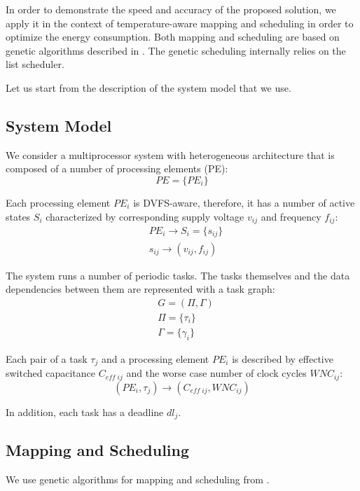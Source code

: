 In order to demonstrate the speed and accuracy of the proposed solution, we apply it in the context of temperature-aware mapping and scheduling in order to optimize the energy consumption. Both mapping and scheduling are based on genetic algorithms described in \cite{schmitz2004}. The genetic scheduling internally relies on the list scheduler.

Let us start from the description of the system model that we use.

\subsection{System Model}
We consider a multiprocessor system with heterogeneous architecture that is composed of a number of processing elements (PE):
\[
  PE = \{ PE_i \}
\]


Each processing element $PE_i$ is DVFS-aware, therefore, it has a number of active states $S_i$ characterized by corresponding supply voltage $v_{ij}$ and frequency $f_{ij}$:
\begin{align*}
  & PE_i \rightarrow S_i = \{ s_{ij} \} \\
  & s_{ij} \rightarrow (v_{ij}, f_{ij})
\end{align*}

The system runs a number of periodic tasks. The tasks themselves and the data dependencies between them are represented with a task graph:
\begin{align*}
  & G = (\Pi, \Gamma) \\
  & \Pi = \{\tau_i\} \\
  & \Gamma = \{\gamma_i\}
\end{align*}

Each pair of a task $\tau_j$ and a processing element $PE_i$ is described by effective switched capacitance $C_{eff \; ij}$ and the worse case number of clock cycles $WNC_{ij}$:
\[
  (PE_i, \tau_j) \rightarrow (C_{eff \; ij}, WNC_{ij})
\]

In addition, each task has a deadline $dl_j$.

\subsection{Mapping and Scheduling}
We use genetic algorithms for mapping and scheduling from \cite{schmitz2004}.

